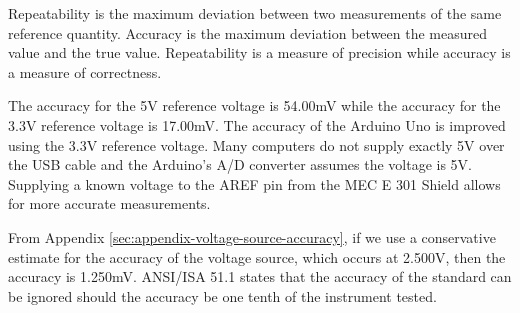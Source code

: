 Repeatability is the maximum deviation between two measurements of the same reference quantity. Accuracy is the maximum deviation between the
measured value and the true value. Repeatability is a measure of precision while accuracy is a measure of correctness.



\noindent The accuracy for the 5V reference voltage is 54.00mV while the accuracy for the 3.3V reference voltage is 17.00mV. The accuracy of the Arduino Uno is improved
using the 3.3V reference voltage. Many computers do not supply exactly 5V over the USB cable and the Arduino's A/D converter assumes the voltage is 5V. 
Supplying a known voltage to the AREF pin from the MEC E 301 Shield allows for more accurate measurements.

\noindent From Appendix \ref{sec:appendix-voltage-source-accuracy}, if we use a conservative estimate for the accuracy of the voltage source, which occurs at 2.500V, then the accuracy is 1.250mV. ANSI/ISA 51.1 states that the accuracy of the standard
can be ignored should the accuracy be one tenth of the instrument tested. %

